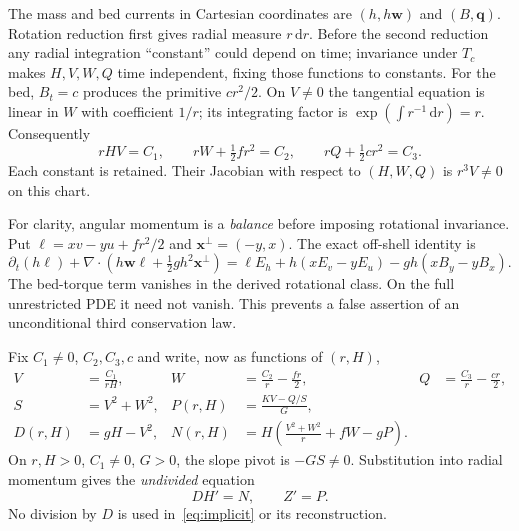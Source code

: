 \documentclass[11pt]{article}
\theoremstyle{remark}\newtheorem{remark}[theorem]{Remark}
\newcommand{\dd}{\,\mathrm d}
\begin{document}
The mass and bed currents in Cartesian coordinates are $(h,h\mathbf w)$ and
$(B,\mathbf q)$. Rotation reduction first gives radial measure $r\dd r$.
Before the second reduction any radial integration ``constant'' could depend
on time; invariance under $T_c$ makes $H,V,W,Q$ time independent, fixing those
functions to constants. For the bed, $B_t=c$ produces the primitive $cr^2/2$.
On $V\ne0$ the tangential equation is linear in $W$ with coefficient $1/r$;
its integrating factor is $\exp(\int r^{-1}\dd r)=r$. Consequently
\begin{equation}
rHV=C_1,\qquad rW+\tfrac12fr^2=C_2,\qquad
rQ+\tfrac12cr^2=C_3.\label{eq:integrals}
\end{equation}
Each constant is retained. Their Jacobian with respect to $(H,W,Q)$ is
$r^3V\ne0$ on this chart.

For clarity, angular momentum is a \emph{balance} before imposing rotational
invariance. Put $\ell=xv-yu+fr^2/2$ and $\mathbf x^\perp=(-y,x)$. The exact
off-shell identity is
\begin{equation}
\partial_t(h\ell)+\nabla\cdot
 \left(h\mathbf w\ell+\tfrac12gh^2\mathbf x^\perp\right)
=\ell E_h+h(xE_v-yE_u)-gh(xB_y-yB_x).\label{eq:torque}
\end{equation}
The bed-torque term vanishes in the derived rotational class. On the full
unrestricted PDE it need not vanish. This prevents a false assertion of an
unconditional third conservation law.

Fix $C_1\ne0$, $C_2,C_3,c$ and write, now as functions of $(r,H)$,
\begin{align}
V&=\frac{C_1}{rH},& W&=\frac{C_2}{r}-\frac{fr}{2},&
Q&=\frac{C_3}{r}-\frac{cr}{2},\label{eq:recover}\\
S&=V^2+W^2,&P(r,H)&=\frac{KV-Q/S}{G},&&\label{eq:slope}\\
D(r,H)&=gH-V^2,&
N(r,H)&=H\left(\frac{V^2+W^2}{r}+fW-gP\right).\label{eq:DN}
\end{align}
On $r,H>0$, $C_1\ne0$, $G>0$, the slope pivot is $-GS\ne0$.
Substitution into radial momentum gives the \emph{undivided} equation
\begin{equation}
DH'=N,\qquad Z'=P.\label{eq:implicit}
\end{equation}
No division by $D$ is used in~\eqref{eq:implicit} or its reconstruction.
\end{document}
